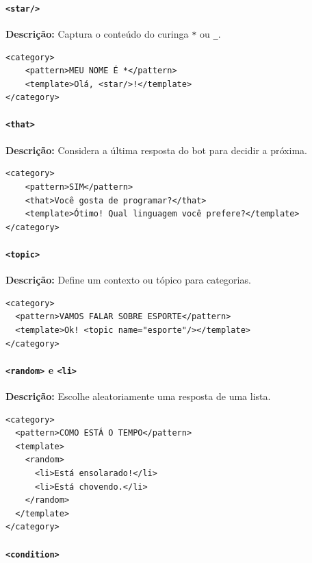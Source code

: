 \documentclass[14pt,a4paper,oneside]{book}
\begin{document}
\paragraph{\texttt{<star/>}} 

\textbf{Descrição:} Captura o conteúdo do curinga \texttt{*} ou \texttt{\_}. 

\begin{lstlisting}
<category>
	<pattern>MEU NOME É *</pattern>
	<template>Olá, <star/>!</template>
</category>
\end{lstlisting}

\paragraph{\texttt{<that>}} 

\textbf{Descrição:} Considera a última resposta do bot para decidir a próxima. 

\begin{lstlisting}
<category>
	<pattern>SIM</pattern>
	<that>Você gosta de programar?</that>
	<template>Ótimo! Qual linguagem você prefere?</template>
</category>
\end{lstlisting}

\paragraph{\texttt{<topic>}} 

\textbf{Descrição:} Define um contexto ou tópico para categorias. 

\begin{lstlisting}
<category>
  <pattern>VAMOS FALAR SOBRE ESPORTE</pattern>
  <template>Ok! <topic name="esporte"/></template>
</category>
\end{lstlisting}

\paragraph{\texttt{<random>} e \texttt{<li>}} 

\textbf{Descrição:} Escolhe aleatoriamente uma resposta de uma lista. 

\begin{lstlisting}
<category>
  <pattern>COMO ESTÁ O TEMPO</pattern>
  <template>
    <random>
      <li>Está ensolarado!</li>
      <li>Está chovendo.</li>
    </random>
  </template>
</category>
\end{lstlisting}

\paragraph{\texttt{<condition>}} 
\end{document}
